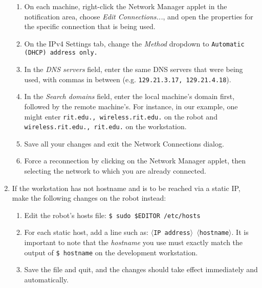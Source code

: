 \documentclass[12pt]{report}
\begin{document}
\begin{sloppypar}
\begin{enumerate}
\begin{enumerate}
\item{On each machine, right-click the Network Manager applet in the notification area, choose \textit{Edit Connections...}, and open the properties for the specific connection that is being used.}
\item{On the IPv4 Settings tab, change the \textit{Method} dropdown to \texttt{Automatic (DHCP) address only.}}
\item{In the \textit{DNS servers} field, enter the same DNS servers that were being used, with commas in between (e.g. \texttt{129.21.3.17, 129.21.4.18}).}
\item{In the \textit{Search domains} field, enter the local machine's domain first, followed by the remote machine's.  For instance, in our example, one might enter \texttt{rit.edu., wireless.rit.edu.} on the robot and \texttt{wireless.rit.edu., rit.edu.} on the workstation.}
\item{Save all your changes and exit the Network Connections dialog.}
\item{Force a reconnection by clicking on the Network Manager applet, then selecting the network to which you are already connected.}
\end{enumerate}
\item{If the workstation has not hostname and is to be reached via a static IP, make the following changes on the robot instead:}
\begin{enumerate}
\item{Edit the robot's hosts file: \texttt{\$\ sudo \$EDITOR /etc/hosts}}
\item{For each static host, add a line such as: \texttt{$\langle$IP address$\rangle$ $\langle$hostname$\rangle$}.  It is important to note that the \textit{hostname} you use must exactly match the output of \texttt{\$\ hostname} on the development workstation.}
\item{Save the file and quit, and the changes should take effect immediately and automatically.}
\end{enumerate}
\end{enumerate}
\end{sloppypar}
\end{document}
